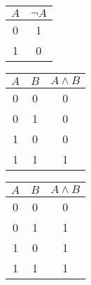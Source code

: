 { %
\captionsetup[table]{labelformat=empty, hypcap=false}

\begin{tcolorbox}[colframe=gray!80, colback=white, boxrule=0.4pt, top=4pt, bottom=4pt]
  \begin{minipage}[t]{0.32\textwidth}
    \centering
    \vspace{-10pt} %
    \vspace{10pt}  %
    \begin{tabular}{c|c}
      \(A\) & \(\neg A\) \\
      \hline
      0 & 1 \\
      1 & 0
    \end{tabular}
  \end{minipage}
  \hfill
  \begin{minipage}[t]{0.32\textwidth}
    \centering
    \vspace{-10pt}
    \vspace{3pt}
    \begin{tabular}{cc|c}
      \(A\) & \(B\) & \(A \land B\)\\
      \hline
      0 & 0 & 0 \\
      0 & 1 & 0 \\
      1 & 0 & 0 \\
      1 & 1 & 1 \\
    \end{tabular}
  \end{minipage}
  \hfill
  \begin{minipage}[t]{0.32\textwidth}
    \centering
    \vspace{-10pt}
    \vspace{3pt}
    \begin{tabular}{cc|c}
      \(A\) & \(B\) & \(A \land B\)\\
      \hline
      0 & 0 & 0 \\
      0 & 1 & 1 \\
      1 & 0 & 1 \\
      1 & 1 & 1 \\
    \end{tabular}
  \end{minipage}
\end{tcolorbox}

}
